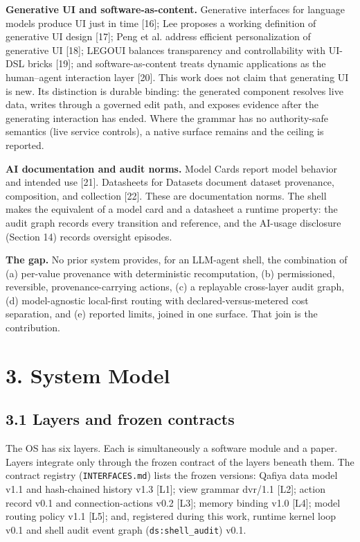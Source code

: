 \documentclass[11pt,a4paper]{article}
\begin{document}
\textbf{Generative UI and software-as-content.} Generative interfaces for language models produce UI just in time [16]; Lee proposes a working definition of generative UI design [17]; Peng et al. address efficient personalization of generative UI [18]; LEGOUI balances transparency and controllability with UI-DSL bricks [19]; and software-as-content treats dynamic applications as the human--agent interaction layer [20]. This work does not claim that generating UI is new. Its distinction is durable binding: the generated component resolves live data, writes through a governed edit path, and exposes evidence after the generating interaction has ended. Where the grammar has no authority-safe semantics (live service controls), a native surface remains and the ceiling is reported.

\textbf{AI documentation and audit norms.} Model Cards report model behavior and intended use [21]. Datasheets for Datasets document dataset provenance, composition, and collection [22]. These are documentation norms. The shell makes the equivalent of a model card and a datasheet a runtime property: the audit graph records every transition and reference, and the AI-usage disclosure (Section 14) records oversight episodes.

\textbf{The gap.} No prior system provides, for an LLM-agent shell, the combination of (a) per-value provenance with deterministic recomputation, (b) permissioned, reversible, provenance-carrying actions, (c) a replayable cross-layer audit graph, (d) model-agnostic local-first routing with declared-versus-metered cost separation, and (e) reported limits, joined in one surface. That join is the contribution.

\section*{3. System Model}
\subsection*{3.1 Layers and frozen contracts}
The OS has six layers. Each is simultaneously a software module and a paper. Layers integrate only through the frozen contract of the layers beneath them. The contract registry (\texttt{INTERFACES.md}) lists the frozen versions: Qafiya data model v1.1 and hash-chained history v1.3 [L1]; view grammar dvr/1.1 [L2]; action record v0.1 and connection-actions v0.2 [L3]; memory binding v1.0 [L4]; model routing policy v1.1 [L5]; and, registered during this work, runtime kernel loop v0.1 and shell audit event graph (\texttt{ds:shell\_audit}) v0.1.
\end{document}

